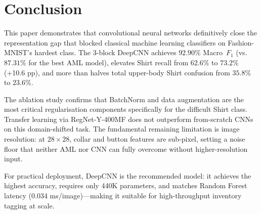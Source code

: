 \documentclass[conference]{IEEEtran}
\begin{document}
\section{Conclusion}\label{sec:conclusion}

This paper demonstrates that convolutional neural networks definitively
close the representation gap that blocked classical machine learning
classifiers on Fashion-MNIST's hardest class. The 3-block DeepCNN
achieves $92.90\%$ Macro~$F_1$ (vs.\ $87.31\%$ for the best AML model),
elevates Shirt recall from $62.6\%$ to $73.2\%$ (+10.6 pp), and more
than halves total upper-body Shirt confusion from $35.8\%$ to $23.6\%$.

The ablation study confirms that BatchNorm and data augmentation are the
most critical regularisation components specifically for the difficult Shirt
class. Transfer learning via RegNet-Y-400MF does not outperform
from-scratch CNNs on this domain-shifted task. The fundamental remaining
limitation is image resolution: at $28\times28$, collar and button features
are sub-pixel, setting a noise floor that neither AML nor CNN can fully
overcome without higher-resolution input.

For practical deployment, DeepCNN is the recommended model: it achieves
the highest accuracy, requires only 440K parameters, and matches Random
Forest latency (0.034 ms/image)---making it suitable for high-throughput
inventory tagging at scale.
\end{document}
